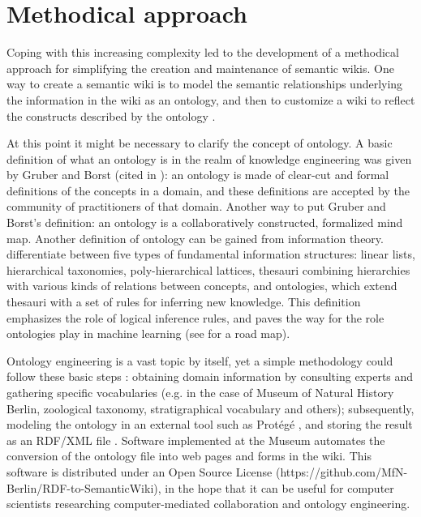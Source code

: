 \documentclass{ijcs_template}
\begin{document}
\section{Methodical approach}
Coping with this increasing complexity led to the development of a methodical approach for simplifying the creation and maintenance of semantic wikis. One way to create a semantic wiki is to model the semantic relationships underlying the information in the wiki as an ontology, and then to customize a wiki to reflect the constructs described by the ontology \cite{diiorio2006}. 

At this point it might be necessary to clarify the concept of ontology. A basic definition of what an ontology is in the realm of knowledge engineering was given by Gruber and Borst (cited in \cite{corcho2003}): an ontology is made of clear-cut and formal definitions of the concepts in a domain, and these definitions are accepted by the community of practitioners of that domain. Another way to put Gruber and Borst's definition: an ontology is a collaboratively constructed, formalized mind map.
Another definition of ontology can be gained from information theory. \citeauthor{pieterse2014} differentiate between five types of fundamental information structures: linear lists, hierarchical taxonomies, poly-hierarchical lattices, thesauri combining hierarchies with various kinds of relations between concepts, and ontologies, which extend thesauri with a set of rules for inferring new knowledge. This definition emphasizes the role of logical inference rules, and paves the way for the role ontologies play in machine learning (see \citeauthor{zhou2007} for a road map).

Ontology engineering is a vast topic by itself, yet a simple methodology could follow these basic steps \cite{noy2001}: obtaining domain information by consulting experts and gathering specific vocabularies (e.g. in the case of Museum of Natural History Berlin, zoological taxonomy, stratigraphical vocabulary and others); subsequently, modeling the ontology in an external tool such as Protégé \cite{musen2015}, and storing the result as an RDF/XML file \cite{musen2015}. Software implemented at the Museum automates the conversion of the ontology file into web pages and forms in the wiki. This software is distributed under an Open Source License (https://github.com/MfN-Berlin/RDF-to-SemanticWiki), in the hope that it can be useful for computer scientists researching computer-mediated collaboration and ontology engineering.
\end{document}
